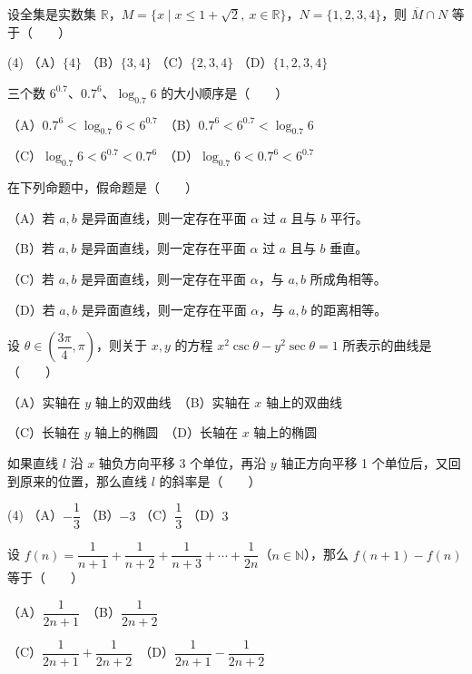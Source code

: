 \begin{question}
设全集是实数集 $\mathbb R$，$M=\{x\mid x\le 1+\sqrt2,\ x\in\mathbb R\}$，$N=\{1,2,3,4\}$，则 $\overline M\cap N$ 等于\mbox{（　　）}

\begin{gkopts}(4)
\task （A）$\{4\}$
\task （B）$\{3,4\}$
\task （C）$\{2,3,4\}$
\task （D）$\{1,2,3,4\}$
\end{gkopts}

\end{question}
\begin{question}
三个数 $6^{0.7}$、$0.7^6$、$\log_{0.7}6$ 的大小顺序是\mbox{（　　）}

（A）$0.7^6<\log_{0.7}6<6^{0.7}$　（B）$0.7^6<6^{0.7}<\log_{0.7}6$

（C）$\log_{0.7}6<6^{0.7}<0.7^6$　（D）$\log_{0.7}6<0.7^6<6^{0.7}$

\end{question}
\begin{question}
在下列命题中，假命题是\mbox{（　　）}

（A）若 $a,b$ 是异面直线，则一定存在平面 $\alpha$ 过 $a$ 且与 $b$ 平行。

（B）若 $a,b$ 是异面直线，则一定存在平面 $\alpha$ 过 $a$ 且与 $b$ 垂直。

（C）若 $a,b$ 是异面直线，则一定存在平面 $\alpha$，与 $a,b$ 所成角相等。

（D）若 $a,b$ 是异面直线，则一定存在平面 $\alpha$，与 $a,b$ 的距离相等。

\end{question}
\begin{question}
设 $\theta\in\left(\dfrac{3\pi}{4},\pi\right)$，则关于 $x,y$ 的方程 $x^2\csc\theta-y^2\sec\theta=1$ 所表示的曲线是\mbox{（　　）}

（A）实轴在 $y$ 轴上的双曲线　（B）实轴在 $x$ 轴上的双曲线

（C）长轴在 $y$ 轴上的椭圆　（D）长轴在 $x$ 轴上的椭圆

\end{question}
\begin{question}
如果直线 $l$ 沿 $x$ 轴负方向平移 3 个单位，再沿 $y$ 轴正方向平移 1 个单位后，又回到原来的位置，那么直线 $l$ 的斜率是\mbox{（　　）}

\begin{gkopts}(4)
\task （A）$-\dfrac13$
\task （B）$-3$
\task （C）$\dfrac13$
\task （D）$3$
\end{gkopts}

\end{question}
\begin{question}
设 $f(n)=\dfrac1{n+1}+\dfrac1{n+2}+\dfrac1{n+3}+\cdots+\dfrac1{2n}$（$n\in\mathbb N$），那么 $f(n+1)-f(n)$ 等于\mbox{（　　）}

（A）$\dfrac1{2n+1}$　（B）$\dfrac1{2n+2}$

（C）$\dfrac1{2n+1}+\dfrac1{2n+2}$　（D）$\dfrac1{2n+1}-\dfrac1{2n+2}$

\end{question}

